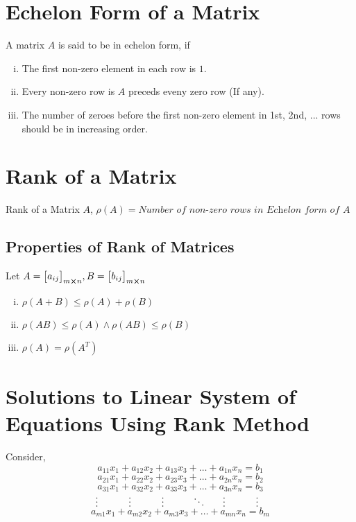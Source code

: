 \documentclass{article}
\begin{document}
\section{Echelon Form of a Matrix}
A matrix $A$ is said to be in echelon form, if
\begin{enumerate}[i.]
    \item The first non-zero element in each row is $1$.
    \item Every non-zero row is $A$ preceds eveny zero row (If any).
    \item The number of zeroes before the first non-zero element in 1st, 2nd, ... rows should be in increasing order.
\end{enumerate}
\section{Rank of a Matrix}
Rank of a Matrix $A$, $\rho(A)=\textit{Number of non-zero rows in Echelon form of A}$
\subsection{Properties of Rank of Matrices}
Let $A={\begin{bmatrix}
        a_{ij}
    \end{bmatrix}}_{m \cross n}, B={\begin{bmatrix}
                b_{ij}
            \end{bmatrix}}_{m \cross n}$
\begin{enumerate}[i.]
    \item $\rho(A+B)\le \rho(A)+\rho(B)$
    \item $\rho(AB)\le \rho(A) \wedge \rho(AB)\le\rho(B)$
    \item $\rho(A)=\rho(A^T)$
\end{enumerate}
\section{Solutions to Linear System of Equations Using Rank Method}
Consider,
$$a_{11}x_{1}+a_{12}x_{2}+a_{13}x_{3}+ \ldots + a_{1n}x_{n}=b_{1}$$
$$a_{21}x_{1}+a_{22}x_{2}+a_{23}x_{3}+ \ldots + a_{2n}x_{n}=b_{2}$$
$$a_{31}x_{1}+a_{32}x_{2}+a_{33}x_{3}+ \ldots + a_{3n}x_{n}=b_{3}$$
$\hphantom{1cm} \hspace{2.6cm} \vdots \hspace{1.1cm} \vdots \hspace{1.1cm} \vdots \hspace{1.0cm} \ddots \hspace{0.6cm} \vdots \hspace{1.1cm} \vdots$
$$a_{m1}x_{1}+a_{m2}x_{2}+a_{m3}x_{3}+ \ldots + a_{mn}x_{n}=b_{m}$$
\end{document}
